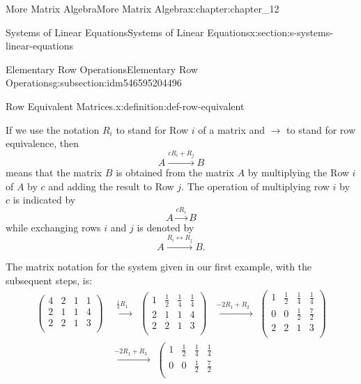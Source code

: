 \documentclass[oneside,10pt,]{book}
\numberwithin{equation}{section}
\begin{document}
\begin{chapterptx}{More Matrix Algebra}{}{More Matrix Algebra}{}{}{x:chapter:chapter_12}
\begin{sectionptx}{Systems of Linear Equations}{}{Systems of Linear Equations}{}{}{x:section:s-systems-linear-equations}
\begin{subsectionptx}{Elementary Row Operations}{}{Elementary Row Operations}{}{}{g:subsection:idm546595204496}
\begin{definition}{Row Equivalent Matrices.}{x:definition:def-row-equivalent}
\end{definition}
If we use the notation \(R_i\) to stand for Row \(i\) of a matrix and \(\longrightarrow\) to stand for row equivalence, then%
\begin{equation*}
A \overset{c R_i+ R_j}{\longrightarrow }B
\end{equation*}
means that the matrix \(B\) is obtained from the matrix \(A\) by multiplying the Row \(i\) of \(A\) by \(c\) and adding the result to Row \(j\).  The operation of multiplying row \(i\) by \(c\) is indicated by%
\begin{equation*}
A \overset{c R_i}{\longrightarrow }B
\end{equation*}
while exchanging rows \(i\) and \(j\) is denoted by%
\begin{equation*}
A \overset{R_i\leftrightarrow R_j}{\longrightarrow }B\text{.}
\end{equation*}
%
\par
The matrix notation for the system given in our first example, with the subsequent steps, is:%
\begin{equation*}
\begin{split}
\left(
\begin{array}{ccc|c}
4 & 2 & 1 & 1 \\
2 & 1 & 1 & 4 \\
2 & 2 & 1 & 3 \\
\end{array}
\right) & \overset{\frac{1}{4} R_1}{\text{  }\longrightarrow }\text{   }\left(
\begin{array}{ccc|c}
1 & \frac{1}{2} & \frac{1}{4} & \frac{1}{4} \\
2 & 1 & 1 & 4 \\
2 & 2 & 1 & 3 \\
\end{array}
\right) \text{         }\overset{-2 R_1+ R_2}{\text{  }\longrightarrow }\text{    }\left(
\begin{array}{ccc|c}
1 & \frac{1}{2} & \frac{1}{4} & \frac{1}{4} \\
0 & 0 & \frac{1}{2} & \frac{7}{2} \\
2 & 2 & 1 & 3 \\
\end{array}
\right) \\
& \overset{-2 R_1+ R_3}{\text{  }\longrightarrow }\text{    }\left(
\begin{array}{ccc|c}
1 & \frac{1}{2} & \frac{1}{4} & \frac{1}{4} \\
0 & 0 & \frac{1}{2} & \frac{7}{2} \\

\end{array}
\end{split}
\end{equation*}
\end{subsectionptx}
\end{sectionptx}
\end{chapterptx}
\end{document}
